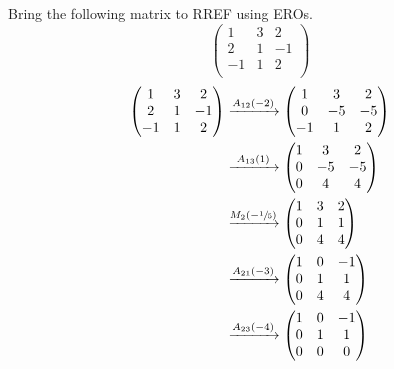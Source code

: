 \begin{example}
    Bring the following matrix to RREF using EROs.
    \[
        \begin{pmatrix}
            1&3&2\\
            2&1&-1\\
            -1&1&2\\
        \end{pmatrix}
    \]
    \begin{align*}
        \begin{pmatrix}
            1&3&2\\
            2&1&-1\\
            -1&1&2\\
        \end{pmatrix}
        &\eroarrow{A_{12}(-2)}{}
        \begin{pmatrix}
            1&3&2\\
            0&-5&-5\\
            -1&1&2\\
        \end{pmatrix}
        \\
        &\eroarrow{A_{13}(1)}{}
        \begin{pmatrix}
            1&3&2\\
            0&-5&-5\\
            0&4&4\\
        \end{pmatrix}
        \\
        &\eroarrow{M_{2}(-\sfrac15)}{}
        \begin{pmatrix}
            1&3&2\\
            0&1&1\\
            0&4&4\\
        \end{pmatrix}
        \\
        &\eroarrow{A_{21}(-3)}{}
        \begin{pmatrix}
            1&0&-1\\
            0&1&1\\
            0&4&4\\
        \end{pmatrix}
        \\
        &\eroarrow{A_{23}(-4)}{}
        \begin{pmatrix}
            1&0&-1\\
            0&1&1\\
            0&0&0\\
        \end{pmatrix}
        \\
    \end{align*}
\end{example}

